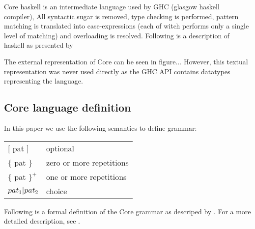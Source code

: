 \documentclass{article}
\begin{document}
Core haskell is an intermediate language used by GHC (glasgow haskell compiler),
All syntactic sugar is removed, type checking is performed, pattern matching is
translated into case-expressions (each of witch performs only a single level of
matching) and overloading is resolved.\cite{jones1992implementing} Following
is a description of haskell as presented by \cite{tolmach2010ghc}

The external representation of Core can be seen in figure... However, this 
textual representation was never used directly as the GHC API contains datatypes 
representing the language.

\subsection{Core language definition}

In this paper we use the following semantics to define grammar:

\begin{tabular}{ l l }

$[$ pat $]$		& optional			\\
$\{$ pat $\}$		& zero or more repetitions	\\
$\{$ pat $\}^{+}$	& one or more repetitions	\\
$pat_{1}|pat_{2}$	& choice			\\

\end{tabular}

Following is a formal definition of the Core grammar as descriped by \cite{jones1992implementing}.
For a more detailed description, see \cite{jones1992implementing}.
\end{document}
